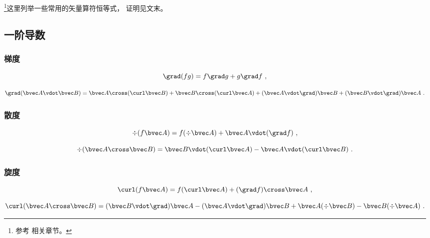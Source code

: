 
\begin{issues}
\end{issues}


\footnote{参考 \cite{GriffE} 相关章节。}这里列举一些常用的矢量算符恒等式， 证明见文末。

\subsection{一阶导数}
\subsubsection{梯度}
\begin{equation}\label{eq_VopEq_2}
\grad (fg) = f\grad g + g \grad f~,
\end{equation}

\begin{equation}
\grad (\bvec A \vdot \bvec B) = \bvec A \cross (\curl \bvec B) + \bvec B \cross (\curl \bvec A) + (\bvec A \vdot \grad) \bvec B + (\bvec B \vdot \grad) \bvec A~.
\end{equation}

\subsubsection{散度}

\begin{equation}\label{eq_VopEq_1}
\div (f \bvec A) = f (\div \bvec A) + \bvec A \vdot (\grad f)~,
\end{equation}

\begin{equation}\label{eq_VopEq_4}
\div (\bvec A \cross \bvec B) = \bvec B \vdot (\curl \bvec A) - \bvec A \vdot (\curl \bvec B)~.
\end{equation}

\subsubsection{旋度}
\begin{equation}\label{eq_VopEq_3}
\curl(f\bvec A) = f (\curl\bvec A) + (\grad f) \cross\bvec A~,
\end{equation}

\begin{equation}\label{eq_VopEq_6}
\curl (\bvec A \cross \bvec B) = (\bvec B \vdot \grad) \bvec A - (\bvec A \vdot \grad) \bvec B + \bvec A (\div \bvec B) - \bvec B (\div \bvec A)~.
\end{equation}

